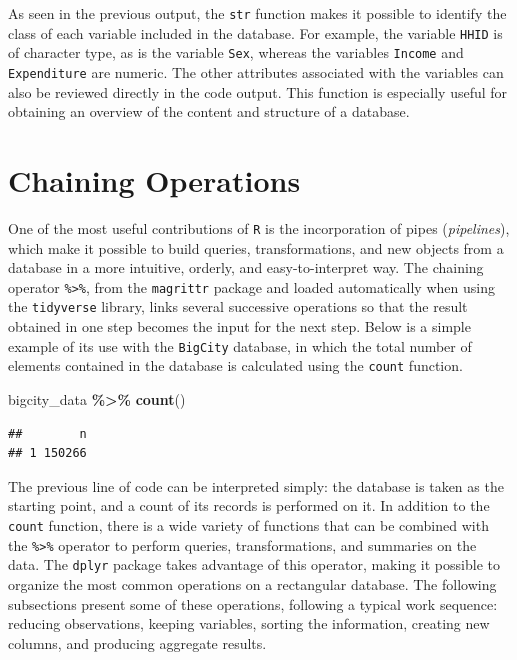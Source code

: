 \documentclass[
  english,
  12pt,
]{book}
\newenvironment{Shaded}{\begin{snugshade}}{\end{snugshade}}
\newcommand{\FunctionTok}[1]{\textcolor[rgb]{0.13,0.29,0.53}{\textbf{#1}}}
\newcommand{\NormalTok}[1]{#1}
\newcommand{\SpecialCharTok}[1]{\textcolor[rgb]{0.81,0.36,0.00}{\textbf{#1}}}
\begin{document}
As seen in the previous output, the \texttt{str} function makes it possible to identify the class of each variable included in the database. For example, the variable \texttt{HHID} is of character type, as is the variable \texttt{Sex}, whereas the variables \texttt{Income} and \texttt{Expenditure} are numeric. The other attributes associated with the variables can also be reviewed directly in the code output. This function is especially useful for obtaining an overview of the content and structure of a database.

\section{Chaining Operations}\label{encadenamiento-de-operaciones}

One of the most useful contributions of \texttt{R} is the incorporation of pipes (\emph{pipelines}), which make it possible to build queries, transformations, and new objects from a database in a more intuitive, orderly, and easy-to-interpret way. The chaining operator \texttt{\%\textgreater{}\%}, from the \texttt{magrittr} package \citep{pipe} and loaded automatically when using the \texttt{tidyverse} library, links several successive operations so that the result obtained in one step becomes the input for the next step. Below is a simple example of its use with the \texttt{BigCity} database, in which the total number of elements contained in the database is calculated using the \texttt{count} function.

\begin{Shaded}
\begin{Highlighting}[]
\NormalTok{bigcity\_data }\SpecialCharTok{\%\textgreater{}\%}
  \FunctionTok{count}\NormalTok{()}
\end{Highlighting}
\end{Shaded}

\begin{verbatim}
##        n
## 1 150266
\end{verbatim}

The previous line of code can be interpreted simply: the database is taken as the starting point, and a count of its records is performed on it. In addition to the \texttt{count} function, there is a wide variety of functions that can be combined with the \texttt{\%\textgreater{}\%} operator to perform queries, transformations, and summaries on the data. The \texttt{dplyr} package takes advantage of this operator, making it possible to organize the most common operations on a rectangular database. The following subsections present some of these operations, following a typical work sequence: reducing observations, keeping variables, sorting the information, creating new columns, and producing aggregate results.
\end{document}
